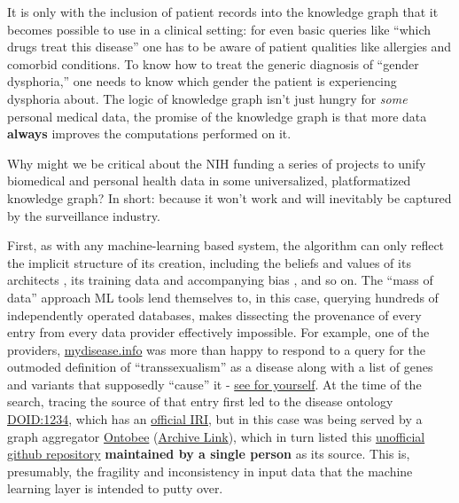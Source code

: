 It is only with the inclusion of patient records into the knowledge
graph that it becomes possible to use in a clinical setting: for even
basic queries like ``which drugs treat this disease'' one has to be
aware of patient qualities like allergies and comorbid conditions. To
know how to treat the generic diagnosis of ``gender dysphoria,'' one
needs to know which gender the patient is experiencing dysphoria about.
The logic of knowledge graph isn't just hungry for \emph{some} personal
medical data, the promise of the knowledge graph is that more data
\textbf{always} improves the computations performed on it.

Why might we be critical about the NIH funding a series of projects to
unify biomedical and personal health data in some universalized,
platformatized knowledge graph? In short: because it won't work and will
inevitably be captured by the surveillance industry.

First, as with any machine-learning based system, the algorithm can only
reflect the implicit structure of its creation, including the beliefs
and values of its architects \cite{birhaneValuesEncodedMachine2022, birhaneAlgorithmicInjusticeRelational2021} , its training data and
accompanying bias \cite{birhaneMultimodalDatasetsMisogyny2021} ,
and so on. The ``mass of data'' approach ML tools lend themselves to, in
this case, querying hundreds of independently operated databases, makes
dissecting the provenance of every entry from every data provider
effectively impossible. For example, one of the providers,
\href{https://mydisease.info}{mydisease.info} was more than happy to
respond to a query for the outmoded definition of ``transsexualism'' as
a disease \cite{ramTransphobiaEncodedExamination2021}  along with
a list of genes and variants that supposedly ``cause'' it -
\href{http://mydisease.info/v1/query?q=\%22DOID\%3A10919\%22}{see for
yourself}. At the time of the search, tracing the source of that entry
first led to the disease ontology
\href{https://web.archive.org/web/20211007053446/https://www.ebi.ac.uk/ols/ontologies/doid/terms?iri=http\%3A\%2F\%2Fpurl.obolibrary.org\%2Fobo\%2FDOID_1234}{DOID:1234},
which has an \href{http://purl.obolibrary.org/obo/doid.owl}{official
IRI}, but in this case was being served by a graph aggregator
\href{http://www.ontobee.org/ontology/DOID?iri=http://purl.obolibrary.org/obo/DOID_1234}{Ontobee}
(\href{https://web.archive.org/web/20210923110103/http://www.ontobee.org/ontology/DOID?iri=http://purl.obolibrary.org/obo/DOID_1234}{Archive
Link}), which in turn listed this
\href{https://github.com/jannahastings/mental-functioning-ontology}{unofficial
github repository} \textbf{maintained by a single person} as its
source. This is,
presumably, the fragility and inconsistency in input data that the
machine learning layer is intended to putty over.

